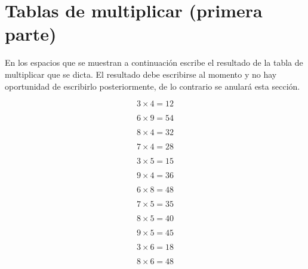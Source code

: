 \documentclass[11pt]{article}
\begin{document}
\setcounter{equation}{0} 

\section{Tablas de multiplicar {\normalsize(primera parte)}}
En los espacios que se muestran a continuaci\'on escribe el resultado de la
tabla de multiplicar que se dicta. El resultado debe escribirse al momento y no
hay oportunidad de escribirlo posteriormente, de lo contrario se anular\'a esta
secci\'on.

\begin{center}
\begin{multicols}{5}

\begin{equation} 3 \times 4 = 12 \end{equation}

\begin{equation} 6 \times 9 = 54 \end{equation}

\begin{equation} 8 \times 4 = 32 \end{equation}

\begin{equation} 7 \times 4 = 28 \end{equation}

\begin{equation} 3 \times 5 = 15 \end{equation}

\begin{equation} 9 \times 4 = 36 \end{equation}

\begin{equation} 6 \times 8 = 48 \end{equation}

\begin{equation} 7 \times 5 = 35 \end{equation}

\begin{equation} 8 \times 5 = 40 \end{equation}

\begin{equation} 9 \times 5 = 45 \end{equation}

\begin{equation} 3 \times 6 = 18 \end{equation}

\begin{equation} 8 \times 6 = 48 \end{equation}


\end{multicols}
\end{center}
\end{document}
